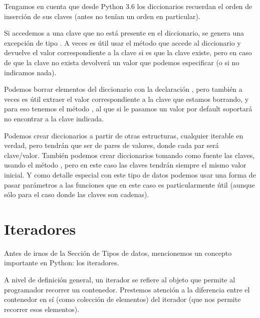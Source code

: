 
Tengamos en cuenta que desde Python 3.6 los diccionarios recuerdan el orden de inserción de sus claves (antes no tenían un orden en particular).

Si accedemos a una clave que no está presente en el diccionario, se genera una excepción de tipo . A veces es útil usar el método  que accede al diccionario y devuelve el valor correspondiente a la clave si es que la clave existe, pero en caso de que la clave no exista devolverá un valor que podemos especificar (o  si no indicamos nada).


Podemos borrar elementos del diccionario con la declaración , pero también a veces es útil extraer el valor correspondiente a la clave que estamos borrando, y para eso tenemos el método , al que si le pasamos un valor por default soportará no encontrar a la clave indicada.


Podemos crear diccionarios a partir de otras estructuras, cualquier iterable en verdad, pero tendrán que ser de pares de valores, donde cada par será clave/valor. También podemos crear diccionarios tomando como fuente las claves, usando el método , pero en este caso las claves tendrán siempre el mismo valor inicial. Y como detalle especial con este tipo de datos podemos usar una forma de pasar parámetros a las funciones que en este caso es particularmente útil (aunque sólo para el caso donde las claves son cadenas).



\section{Iteradores}

Antes de irnos de la Sección de Tipos de datos, mencionemos un concepto importante en Python: los iteradores.

A nivel de definición general, un iterador se refiere al objeto que permite al programador recorrer un contenedor. Prestemos atención a la diferencia entre el contenedor en sí (como colección de elementos) del iterador (que nos permite recorrer esos elementos).

